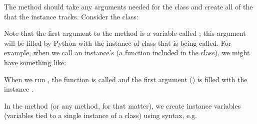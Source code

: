 \documentclass[letterpaper,10pt,english]{jupyterBook}
\begin{document}
\sphinxAtStartPar
The  method should take any arguments needed for the class and create all of the  that the instance tracks. Consider the  class:

\begin{sphinxVerbatim}[commandchars=\\\{\}]
 
         
          
          
          
          
\end{sphinxVerbatim}

\sphinxAtStartPar
Note that the first argument to the  method is a variable called ; this argument will be filled by Python with the instance of class that is being called. For example, when we call an instance’s  (a function included in the class), we might have something like:

\begin{sphinxVerbatim}[commandchars=\\\{\}]
 
     
         

  
\end{sphinxVerbatim}

\sphinxAtStartPar
When we run , the function  is called and the first argument () is filled with the instance .

\sphinxAtStartPar
In the  method (or any method, for that matter), we create instance variables (variables tied to a single instance of a class) using  syntax, e.g.
\end{document}
